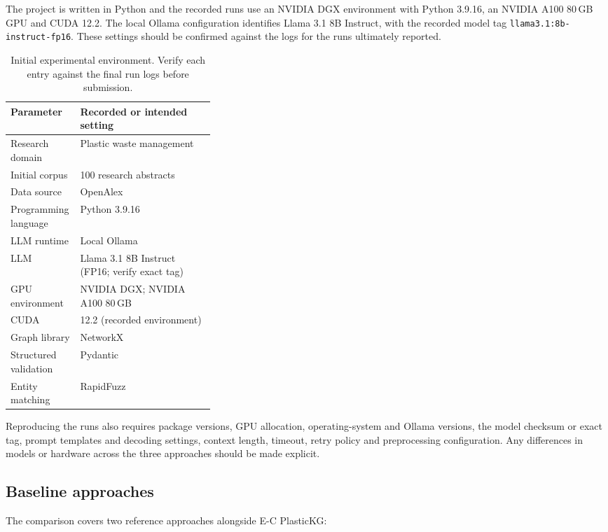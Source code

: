 \documentclass[11pt,a4paper]{article}
\begin{document}
The project is written in Python and the recorded runs use an NVIDIA DGX environment with Python 3.9.16, an NVIDIA A100 80\,GB GPU and CUDA 12.2. The local Ollama configuration identifies Llama 3.1 8B Instruct, with the recorded model tag \texttt{llama3.1:8b-instruct-fp16}. These settings should be confirmed against the logs for the runs ultimately reported.

\begin{table}[htbp]
\centering
\caption{Initial experimental environment. Verify each entry against the final run logs before submission.}
\label{tab:environment}
\begin{tabularx}{\linewidth}{>{\raggedright\arraybackslash}p{0.34\linewidth}X}
\toprule
\textbf{Parameter} & \textbf{Recorded or intended setting}\\
\midrule
Research domain & Plastic waste management\\
Initial corpus & 100 research abstracts\\
Data source & OpenAlex\\
Programming language & Python 3.9.16\\
LLM runtime & Local Ollama\\
LLM & Llama 3.1 8B Instruct (FP16; verify exact tag)\\
GPU environment & NVIDIA DGX; NVIDIA A100 80\,GB\\
CUDA & 12.2 (recorded environment)\\
Graph library & NetworkX\\
Structured validation & Pydantic\\
Entity matching & RapidFuzz\\
\bottomrule
\end{tabularx}
\end{table}

Reproducing the runs also requires package versions, GPU allocation, operating-system and Ollama versions, the model checksum or exact tag, prompt templates and decoding settings, context length, timeout, retry policy and preprocessing configuration. Any differences in models or hardware across the three approaches should be made explicit.

\subsection{Baseline approaches}

The comparison covers two reference approaches alongside E-C PlasticKG:
\end{document}
